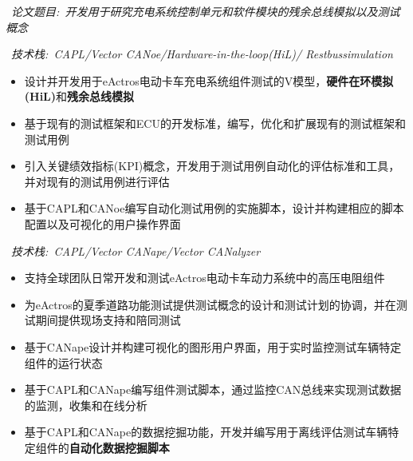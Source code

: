 \documentclass{resume}
\begin{document}
\ \textit{论文题目:\ 开发用于研究充电系统控制单元和软件模块的残余总线模拟以及测试概念}

\ \textit{技术栈:\ CAPL/Vector CANoe/Hardware-in-the-loop(HiL)/
Restbussimulation}
\begin{itemize}
  \item 设计并开发用于eActros电动卡车充电系统组件测试的V模型，\textbf{硬件在环模拟(HiL)}和\textbf{残余总线模拟}
  \item 基于现有的测试框架和ECU的开发标准，编写，优化和扩展现有的测试框架和测试用例
  \item 引入关键绩效指标(KPI)概念，开发用于测试用例自动化的评估标准和工具，并对现有的测试用例进行评估
  \item 基于CAPL和CANoe编写自动化测试用例的实施脚本，设计并构建相应的脚本配置以及可视化的用户操作界面
\end{itemize}


\ \textit{技术栈:\ CAPL/Vector CANape/Vector CANalyzer}
\begin{itemize}
  \item 支持全球团队日常开发和测试eActros电动卡车动力系统中的高压电阻组件
  \item 为eActros的夏季道路功能测试提供测试概念的设计和测试计划的协调，并在测试期间提供现场支持和陪同测试
  \item 基于CANape设计并构建可视化的图形用户界面，用于实时监控测试车辆特定组件的运行状态
  \item 基于CAPL和CANape编写组件测试脚本，通过监控CAN总线来实现测试数据的监测，收集和在线分析
  \item 基于CAPL和CANape的数据挖掘功能，开发并编写用于离线评估测试车辆特定组件的\textbf{自动化数据挖掘脚本}
\end{itemize}
\end{document}
